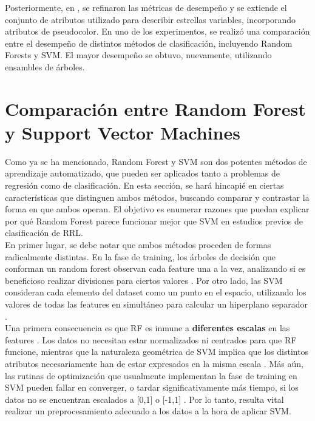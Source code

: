 Posteriormente, en \cite{jbc}, se refinaron las métricas de desempeño y se extiende el conjunto de atributos utilizado para describir estrellas variables, incorporando atributos de pseudocolor. En uno de los experimentos, se realizó una comparación entre el desempeño de distintos métodos de clasificación, incluyendo Random Forests y SVM. El mayor desempeño se obtuvo, nuevamente, utilizando ensambles de árboles.


\section{ Comparación entre Random Forest y Support Vector Machines}

Como ya se ha mencionado, Random Forest y SVM son dos potentes métodos de aprendizaje automatizado, que pueden ser aplicados tanto a problemas de regresión como de clasificación. En esta sección, se hará hincapié en ciertas características que distinguen ambos métodos, buscando comparar y contrastar la forma en que ambos operan. El objetivo es enumerar razones que puedan explicar por qué Random Forest parece funcionar mejor que SVM en estudios previos de clasificación de RRL.\\

En primer lugar, se debe notar que ambos métodos proceden de formas radicalmente distintas. En la fase de training, los árboles de decisión que conforman un random forest observan cada feature una a la vez, analizando si es beneficioso realizar divisiones para ciertos valores \cite{mitchell}. Por otro lado, las SVM consideran cada elemento del dataset como un punto en el espacio, utilizando los valores de todas las features en simultáneo para calcular un hiperplano separador \cite{svm2}. \\

Una primera consecuencia es que RF es inmune a \textbf{diferentes escalas} en las features \cite{statisticallearning}. Los datos no necesitan estar normalizados ni centrados para que RF funcione, mientras que la naturaleza geométrica de SVM implica que los distintos atributos necesariamente han de estar expresados en la misma escala \cite{svm_practical}. Más aún, las rutinas de optimización que usualmente implementan la fase de training en SVM pueden fallar en converger, o tardar significativamente más tiempo, si los datos no se encuentran escalados a [0,1] o [-1,1]
\cite{svm_practical}. Por lo tanto, resulta vital realizar un preprocesamiento adecuado a los datos a la hora de aplicar SVM. \\ 

